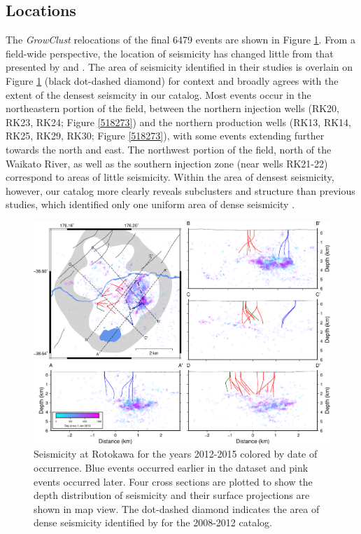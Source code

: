 \subsection{Locations}
The \textit{GrowClust} relocations of the final 6479 events are shown in Figure \ref{349058}. From a field-wide perspective, the location of seismicity has changed little from that presented by \citet{Sherburn_2015} and \citep{Sewell_2015WGC}. The area of seismicity identified in their studies is overlain on Figure \ref{349058} (black dot-dashed diamond) for context and broadly agrees with the extent of the densest seismcity in our catalog. Most events occur in the northeastern portion of the field, between the northern injection wells (RK20, RK23, RK24; Figure \ref{518273}) and the northern production wells (RK13, RK14, RK25, RK29, RK30; Figure \ref{518273}), with some events extending further towards the north and east. The northwest portion of the field, north of the Waikato River, as well as the southern injection zone (near wells RK21-22) correspond to areas of little seismicity. Within the area of densest seismicity, however, our catalog more clearly reveals subclusters and structure than previous studies, which identified only one uniform area of dense seismicity \citep{Sherburn_2015}.

\begin{figure}[h!]
\begin{center}
\includegraphics[width=1.00\columnwidth]{Chapter_4_Rot/figures/merc_Rot_dets_just_GC/merc_Rot_dets_just_GC}
\caption[Final Rotokawa seismic catalog]{{
Seismicity at Rotokawa for the years 2012-2015 colored by date of
occurrence. Blue events occurred earlier in the dataset and pink events
occurred later. Four cross sections are plotted to show the depth
distribution of seismicity and their surface projections are shown in
map view. The dot-dashed diamond indicates the area of dense seismicity
identified by \protect\citealp{Sherburn_2015,Sewell_2015WGC} for the 2008-2012 catalog.
{\label{349058}}%
}}
\end{center}
\end{figure}

